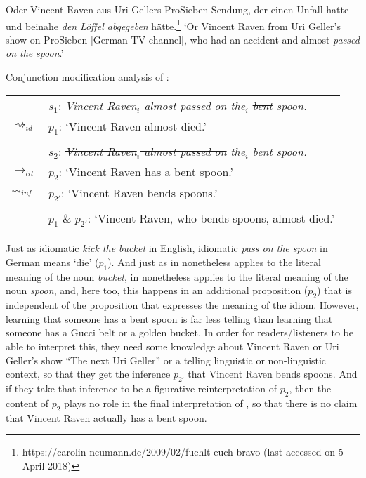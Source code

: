 \documentclass[output=paper]{langsci/langscibook}
\begin{document}
\ea \label{bent spoon}
Oder Vincent Raven aus Uri Gellers ProSieben-Sendung, der einen Unfall hatte und beinahe \textit{den} \underline{} \textit{Löffel abgegeben} hätte.\footnote{https://carolin-neumann.de/2009/02/fuehlt-euch-bravo (last accessed on 5 April 2018)}
\vspace{5pt}
\glt `Or Vincent Raven from Uri Geller's show on ProSieben [German TV channel], who had an accident and almost \textit{passed on the} \underline{} \textit{spoon}.'
\z

\ea \label{analysis bent spoon} 
Conjunction modification analysis of : \\
\vspace{5pt}
\begin{tabular}{ll}
								& 	$s_{1}$: \hspace{4pt} \textit{Vincent Raven$_{i}$ almost passed on the$_{i}$ \sout{bent} spoon.} \\
$\rightsquigarrow_{id}$				&	$p_{1}$: \hspace{1pt} `Vincent Raven almost died.' \\
\vspace{-5pt} \\
								& 	$s_{2}$: \hspace{4pt} \textit{\sout{Vincent Raven$_{i}$ almost passed on} the$_{i}$ bent spoon.} \\
$\rightarrow_{lit}$					&	$p_{2}$: \hspace{1pt} `Vincent Raven has a bent spoon.' \\
$\rightsquigarrow_{in\hspace{-0.8pt} f}$	&	$p_{2'}$: \hspace{-1.5pt} `Vincent Raven bends spoons.' \\
\vspace{-5pt} \\
								&	$p_{1}$ \& $p_{2'}$: `Vincent Raven, who bends spoons, almost died.'
\end{tabular}
\z

\noindent Just as idiomatic \textit{kick the bucket} in English, idiomatic \textit{pass on the spoon} in German means `die' ($p_{1}$). And just as \underline{} in  nonetheless applies to the literal meaning of the noun \textit{bucket}, \underline{} in  nonetheless applies to the literal meaning of the noun \textit{spoon}, and, here too, this happens in an additional proposition ($p_{2}$) that is independent of the proposition that expresses the meaning of the idiom. However, learning that someone has a bent spoon is far less telling than learning that someone has a Gucci belt or a golden bucket. In order for readers/listeners to be able to interpret this, they need some knowledge about Vincent Raven or Uri Geller's show ``The next Uri Geller'' or a telling linguistic or non-linguistic context, so that they get the inference $p_{2'}$ that Vincent Raven bends spoons. And if they take that inference to be a figurative reinterpretation of $p_{2}$, then the content of $p_{2}$ plays no role in the final interpretation of , so that there is no claim that Vincent Raven actually has a bent spoon.
\end{document}
